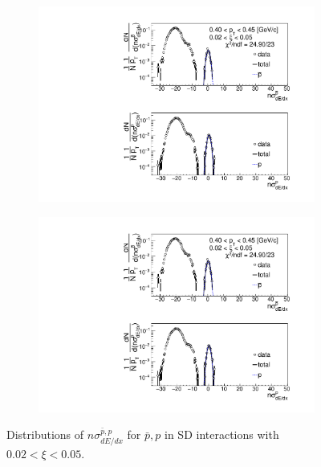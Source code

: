 \begin{figure}[h!]
\begin{subfigure}{.32\textwidth}
		\includegraphics[width=\linewidth, page=11]{chapters/chrgSTAR/img/dEdx/fit2019_thirdStep_2_0.pdf}
	\end{subfigure}
	\begin{subfigure}{.32\textwidth}
		\includegraphics[width=\linewidth, page=12]{chapters/chrgSTAR/img/dEdx/fit2019_thirdStep_2_0.pdf}
	\end{subfigure}
	\caption[Distributions of $n\sigma^{\bar{p},p}_{dE/dx}$ for $\bar{p},p$ in SD interactions with $0.02 < \xi<0.05$]{Distributions of $n\sigma^{\bar{p},p}_{dE/dx}$ for $\bar{p},p$ in SD interactions with $0.02 < \xi<0.05$.}
	\label{fig:nsigmapfit_0}
\end{figure}
